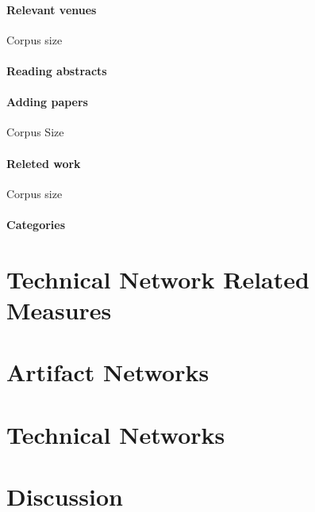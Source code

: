 \paragraph{Relevant venues}

Corpus size

\paragraph{Reading abstracts}

\paragraph{Adding papers}

Corpus Size

\paragraph{Releted work}

Corpus size

\paragraph{Categories}

\section{Technical Network Related Measures}
\label{chap:6:measure}
\section{Artifact Networks}
\label{chap:6:an}
\section{Technical Networks}
\label{chap:6:tn}
\section{Discussion}
\label{chap:6:dis}
